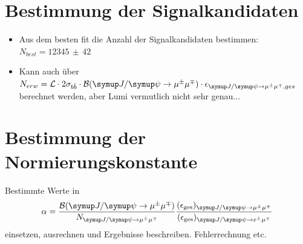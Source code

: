 \section{Bestimmung der Signalkandidaten}
%
\begin{itemize}
  \item Aus dem besten fit die Anzahl der Signalkandidaten bestimmen: $N_{best}=12345\,\pm\,42$
  \item Kann auch über $N_{erw}=\mathcal{L}\cdot 2\sigma_{b\bar{b}}\cdot\mathcal{B}(\kontroll)\cdot\epsilon_{\kontroll, ges}$ berechnet werden, aber Lumi vermutlich nicht sehr genau...
\end{itemize}
%
\section{Bestimmung der Normierungskonstante}
%
Bestimmte Werte in
%
\begin{equation}
  \alpha=\frac{\mathcal{B}(\kontroll)}{N_{\kontroll}}\frac{(\epsilon_{\text{ges}})_{\kontroll}}{(\epsilon_{\text{ges}})_{\signal}}
  \label{eq:konst}
\end{equation}
%
einsetzen, ausrechnen und Ergebnisse beschreiben. Fehlerrechnung etc.

